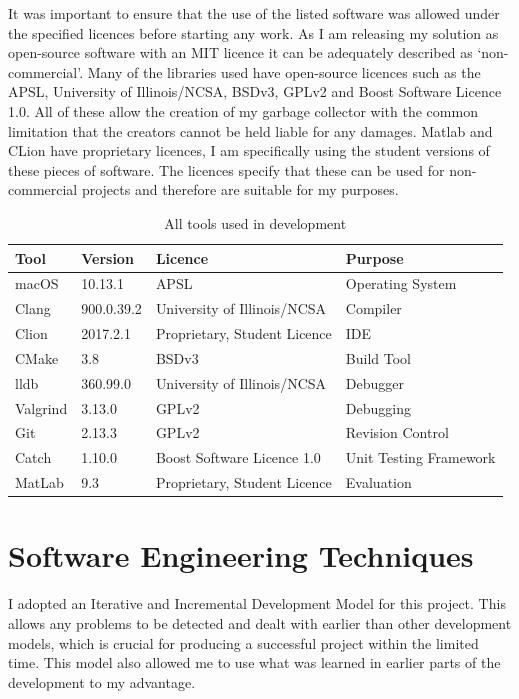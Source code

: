 \documentclass[../diss.tex]{subfiles}
\begin{document}
It was important to ensure that the use of the listed software was allowed under the specified licences before starting any work. As I am releasing my solution as open-source software with an MIT licence it can be adequately described as `non-commercial'. Many of the libraries used have open-source licences such as the APSL, University of Illinois/NCSA, BSDv3, GPLv2 and Boost Software Licence 1.0. All of these allow the creation of my garbage collector with the common limitation that the creators cannot be held liable for any damages. Matlab and CLion have proprietary licences, I am specifically using the student versions of these pieces of software. The licences specify that these can be used for non-commercial projects and therefore are suitable for my purposes.

\begin{table}
    \centering
    \begin{tabular}{|l|l|l|l|}
        \hline
        \bf{Tool} & \bf{Version} & \bf{Licence} & \bf{Purpose} \\ \hline
        macOS & 10.13.1 & APSL & Operating System \\ \hline
        Clang & 900.0.39.2 & University of Illinois/NCSA & Compiler \\ \hline
        Clion & 2017.2.1 & Proprietary, Student Licence & IDE \\ \hline
        CMake & 3.8 & BSDv3 & Build Tool \\ \hline
        lldb & 360.99.0 & University of Illinois/NCSA & Debugger \\ \hline
        Valgrind & 3.13.0 & GPLv2 & Debugging \\ \hline
        Git & 2.13.3 & GPLv2 & Revision Control \\ \hline
        Catch & 1.10.0 & Boost Software Licence 1.0 & Unit Testing Framework \\ \hline
        MatLab & 9.3 & Proprietary, Student Licence & Evaluation \\ \hline
    \end{tabular}
    \caption{All tools used in development}
    \label{tab:tools}
\end{table}

\section{Software Engineering Techniques} \label{sec:softwareengineering}

I adopted an Iterative and Incremental Development Model for this project. This allows any problems to be detected and dealt with earlier than other development models, which is crucial for producing a successful project within the limited time. This model also allowed me to use what was learned in earlier parts of the development to my advantage.
\end{document}
